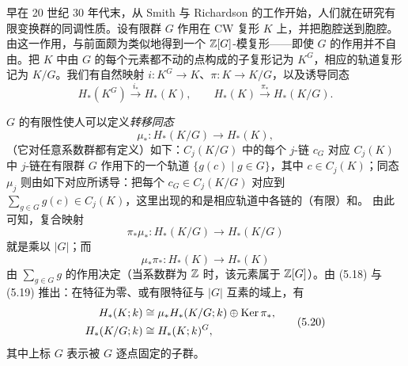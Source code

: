 早在 20 世纪 30 年代末，从 Smith 与 Richardson 的工作开始，人们就在研究有限变换群的同调性质。设有限群 $G$ 作用在 CW 复形 $K$ 上，并把胞腔送到胞腔。由这一作用，与前面颇为类似地得到一个 $\mathbb{Z}[G]$-模复形——即使 $G$ 的作用并不自由。把 $K$ 中由 $G$ 的每个元素都不动的点构成的子复形记为 $K^G$，相应的轨道复形记为 $K/G$。我们有自然映射 $i\colon K^G\to K$、$\pi\colon K\to K/G$，以及诱导同态
\[
  H_*(K^G)\xrightarrow{i_*}H_*(K),\qquad H_*(K)\xrightarrow{\pi_*}H_*(K/G).
\]

$G$ 的有限性使人可以定义\emph{转移同态}
\[
  \mu_*\colon H_*(K/G)\longrightarrow H_*(K),
\]
（它对任意系数群都有定义）如下：$C_j(K/G)$ 中的每个 $j$-链 $c_G$ 对应 $C_j(K)$ 中 $j$-链在有限群 $G$ 作用下的一个轨道 $\{g(c)\mid g\in G\}$，其中 $c\in C_j(K)$；同态 $\mu_j$ 则由如下对应所诱导：把每个 $c_G\in C_j(K/G)$ 对应到 $\sum_{g\in G}g(c)\in C_j(K)$，这里出现的和是相应轨道中各链的（有限）和。
由此可知，复合映射
\begin{equation}
  \pi_*\mu_*\colon H_*(K/G)\longrightarrow H_*(K/G) \tag{5.18}
\end{equation}
就是乘以 $|G|$；而
\begin{equation}
  \mu_*\pi_*\colon H_*(K)\longrightarrow H_*(K) \tag{5.19}
\end{equation}
由 $\sum_{g\in G}g$ 的作用决定（当系数群为 $\mathbb{Z}$ 时，该元素属于 $\mathbb{Z}[G]$）。由 (5.18) 与 (5.19) 推出：在特征为零、或有限特征与 $|G|$ 互素的域上，有
\begin{equation}
\begin{aligned}
  H_*(K;k)&\cong\mu_*H_*(K/G;k)\oplus\operatorname{Ker}\pi_*,\\
  H_*(K/G;k)&\cong H_*(K;k)^G,
\end{aligned}\tag{5.20}
\end{equation}
其中上标 $G$ 表示被 $G$ 逐点固定的子群。

